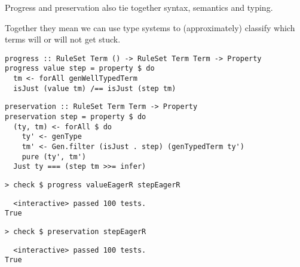 \begin{frame}[c]
  Progress and preservation also tie together syntax, semantics and typing.
\end{frame}

\begin{frame}[c]
  Together they mean we can use type systems to (approximately) classify which terms will or will not get stuck.
\end{frame}

\begin{frame}[fragile]
  \begin{verbatim}
progress :: RuleSet Term () -> RuleSet Term Term -> Property
progress value step = property $ do
  tm <- forAll genWellTypedTerm
  isJust (value tm) /== isJust (step tm)
  \end{verbatim}

  \begin{verbatim}
preservation :: RuleSet Term Term -> Property
preservation step = property $ do
  (ty, tm) <- forAll $ do
    ty' <- genType
    tm' <- Gen.filter (isJust . step) (genTypedTerm ty')
    pure (ty', tm')
  Just ty === (step tm >>= infer)
  \end{verbatim}
\end{frame}

\begin{frame}[fragile]
  \onslide<+->
  \begin{verbatim}
> check $ progress valueEagerR stepEagerR
  \end{verbatim}
  \onslide<+->
  \begin{verbatim}
  <interactive> passed 100 tests.
True
  \end{verbatim}
  \onslide<+->
  \begin{verbatim}
> check $ preservation stepEagerR
  \end{verbatim}
  \onslide<+->
  \begin{verbatim}
  <interactive> passed 100 tests.
True
  \end{verbatim}

\end{frame}

